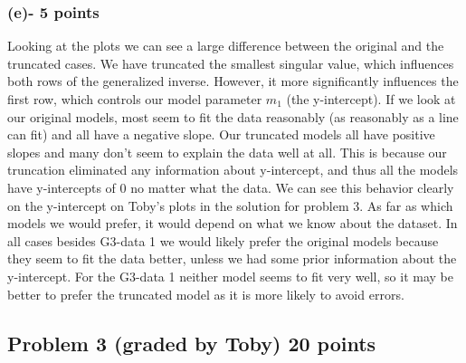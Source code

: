 \documentclass[11pt]{article}
\begin{document}
\subsubsection*{(e)- 5 points}
Looking at the plots we can see a large difference between the original and the truncated cases.  We have truncated the smallest singular value, which influences both rows of the generalized inverse.  However, it more significantly influences the first row, which controls our model parameter $m_1$ (the y-intercept).  If we look at our original models, most seem to fit the data reasonably (as reasonably as a line can fit) and all have a negative slope.  Our truncated models all have positive slopes and many don't seem to explain the data well at all.  This is because our truncation eliminated any information about y-intercept, and thus all the models have y-intercepts of 0 no matter what the data.  We can see this behavior clearly on the y-intercept on Toby's plots in the solution for problem 3.  As far as which models we would prefer, it would depend on what we know about the dataset.  In all cases besides G3-data 1 we would likely prefer the original models because they seem to fit the data better, unless we had some prior information about the y-intercept.  For the G3-data 1 neither model seems to fit very well, so it may be better to prefer the truncated model as it is more likely to avoid errors.


\subsection*{Problem 3 (graded by Toby) 20 points}
\end{document}
